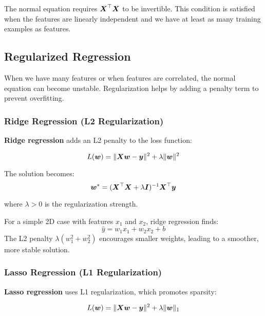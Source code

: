\begin{remark}
The normal equation requires $\boldsymbol{X}^\top \boldsymbol{X}$ to be invertible. This condition is satisfied when the features are linearly independent and we have at least as many training examples as features.
\end{remark}

\subsection{Regularized Regression}

When we have many features or when features are correlated, the normal equation can become unstable. Regularization helps by adding a penalty term to prevent overfitting.

\subsubsection{Ridge Regression (L2 Regularization)}

\textbf{Ridge regression} adds an L2 penalty to the loss function:

\begin{equation}
L(\boldsymbol{w}) = \|\boldsymbol{X}\boldsymbol{w} - \boldsymbol{y}\|^2 + \lambda \|\boldsymbol{w}\|^2
\end{equation}

The solution becomes:
\begin{equation}
\boldsymbol{w}^* = (\boldsymbol{X}^\top \boldsymbol{X} + \lambda \boldsymbol{I})^{-1} \boldsymbol{X}^\top \boldsymbol{y}
\end{equation}

where $\lambda > 0$ is the regularization strength.

\begin{example}
For a simple 2D case with features $x_1$ and $x_2$, ridge regression finds:
$$\hat{y} = w_1 x_1 + w_2 x_2 + b$$
The L2 penalty $\lambda(w_1^2 + w_2^2)$ encourages smaller weights, leading to a smoother, more stable solution.
\end{example}

\subsubsection{Lasso Regression (L1 Regularization)}

\textbf{Lasso regression} uses L1 regularization, which promotes sparsity:

\begin{equation}
L(\boldsymbol{w}) = \|\boldsymbol{X}\boldsymbol{w} - \boldsymbol{y}\|^2 + \lambda \|\boldsymbol{w}\|_1
\end{equation}

